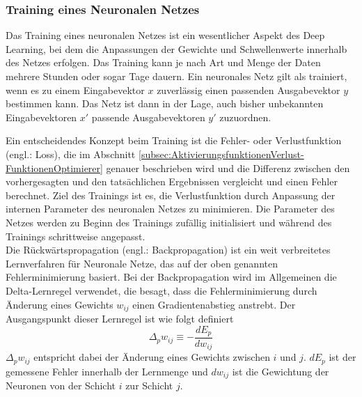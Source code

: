 \subsubsection{Training eines Neuronalen Netzes}
Das Training eines neuronalen Netzes ist ein wesentlicher Aspekt des Deep Learning, bei dem die Anpassungen der Gewichte und Schwellenwerte innerhalb des Netzes erfolgen. Das Training kann je nach Art und Menge der Daten mehrere Stunden oder sogar Tage dauern. Ein neuronales Netz gilt als trainiert, wenn es zu einem Eingabevektor $x$ zuverlässig einen passenden Ausgabevektor $y$ bestimmen kann. Das Netz ist dann in der Lage, auch bisher unbekannten Eingabevektoren $x'$ passende Ausgabevektoren $y'$ zuzuordnen. \cite[vgl.][]{Scherer1997}

Ein entscheidendes Konzept beim Training ist die Fehler- oder Verlustfunktion (engl.: Loss), die im Abschnitt  \ref{subsec:AktivierungsfunktionenVerlust-FunktionenOptimierer} genauer beschrieben wird und die Differenz zwischen den vorhergesagten und den tatsächlichen Ergebnissen vergleicht und einen Fehler berechnet. Ziel des Trainings ist es, die Verlustfunktion durch Anpassung der internen Parameter des neuronalen Netzes zu minimieren. Die Parameter des Netzes werden zu Beginn des Trainings zufällig initialisiert und während des Trainings schrittweise angepasst. \cite[vgl.][]{Choo2020}\\
Die Rückwärtspropagation (engl.: Backpropagation) ist ein weit verbreitetes Lernverfahren für Neuronale Netze, das auf der oben genannten Fehlerminimierung basiert. Bei der Backpropagation wird im Allgemeinen die Delta-Lernregel verwendet, die besagt, dass die Fehlerminimierung durch Änderung eines Gewichts $w_{ij}$ einen Gradientenabstieg anstrebt. Der Ausgangspunkt dieser Lernregel ist wie folgt definiert
\begin{equation}
	\Delta_{p}w_{ij} \equiv -\dfrac{dE_p}{dw_{ij}}
\end{equation}
$\Delta_{p}w_{ij}$ entspricht dabei der Änderung eines Gewichts zwischen $i$ und $j$. $dE_p$ ist der gemessene Fehler innerhalb der Lernmenge und $dw_{ij}$ ist die Gewichtung der Neuronen von der Schicht $i$ zur Schicht $j$. \cite[vgl.][]{Rumelhart1986}

